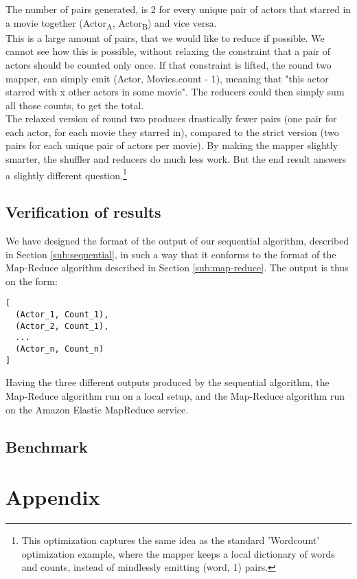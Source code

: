 \documentclass[a4paper,11pt]{article}
\begin{document}
The number of pairs generated, is 2 for every unique pair of actors that starred in a movie together (Actor\textsubscript{A}, Actor\textsubscript{B}) and vice versa.\\
This is a large amount of pairs, that we would like to reduce if possible. We cannot see how this is possible, without relaxing the constraint that a pair of actors should be counted only once. If that constraint is lifted, the round two mapper, can simply emit (Actor, Movies.count - 1), meaning that "this actor starred with x other actors in some movie". The reducers could then simply sum all those counts, to get the total.\\
The relaxed version of round two produces drastically fewer pairs (one pair for each actor, for each movie they starred in), compared to the strict version (two pairs for each unique pair of actors per movie). By making the mapper slightly smarter, the shuffler and reducers do much less work. But the end result answers a slightly different question.\footnote{This optimization captures the same idea as the standard 'Wordcount' optimization example, where the mapper keeps a local dictionary of words and counts, instead of mindlessly emitting (word, 1) pairs.}

\subsection{Verification of results}
We have designed the format of the output of our sequential algorithm, described in Section \ref{sub:sequential}, in such a way that it conforms to the format of the Map-Reduce algorithm described in Section \ref{sub:map-reduce}. 
The output is thus on the form:
\begin{verbatim}
[ 
  (Actor_1, Count_1),
  (Actor_2, Count_1),
  ...
  (Actor_n, Count_n)
]
\end{verbatim}

Having the three different outputs produced by the sequential algorithm, the Map-Reduce algorithm run on a local setup, and the Map-Reduce algorithm run on the Amazon Elastic MapReduce service. 

\subsection{Benchmark}

\section{Appendix}
\end{document}
